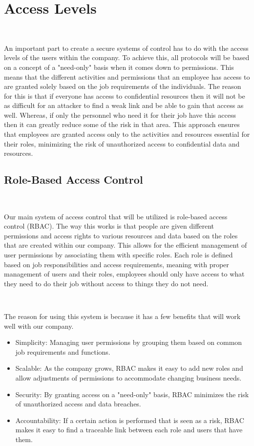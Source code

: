 \documentclass[12pt,a4paper]{report}
\begin{document}
\section{Access Levels}
\

An important part to create a secure systems of control has to do with the access levels of the users within the company.
To achieve this, all protocols will be based on a concept of a "need-only" basis when it comes down to permissions.
This means that the different activities and permissions that an employee has access to are granted solely based on the job requirements of the individuals.
The reason for this is that if everyone has access to confidential resources then it will not be as difficult for an attacker to find a weak link and be able to gain that access as well.
Whereas, if only the personnel who need it for their job have this access then it can greatly reduce some of the risk in that area.
This approach ensures that employees are granted access only to the activities and resources essential for their roles, minimizing the risk of unauthorized access to confidential data and resources.

\subsection{Role-Based Access Control}
\

Our main system of access control that will be utilized is role-based access control (RBAC). 
The way this works is that people are given different permissions and access rights to various resources and data based on the roles that are created within our company.
This allows for the efficient management of user permissions by associating them with specific roles.
Each role is defined based on job responsibilities and access requirements, meaning with proper management of users and their roles, employees should only have access to what they need to do their job without access to things they do not need. 

\

The reason for using this system is because it has a few benefits that will work well with our company.
\begin{itemize}
 \item Simplicity: Managing user permissions by grouping them based on common job requirements and functions.
 \item Scalable: As the company grows, RBAC makes it easy to add new roles and allow adjustments of permissions to accommodate changing business needs.
 \item Security: By granting access on a "need-only" basis, RBAC minimizes the risk of unauthorized access and data breaches.
 \item Accountability: If a certain action is performed that is seen as a risk, RBAC makes it easy to find a traceable link between each role and users that have them.
\end{itemize}
\end{document}
